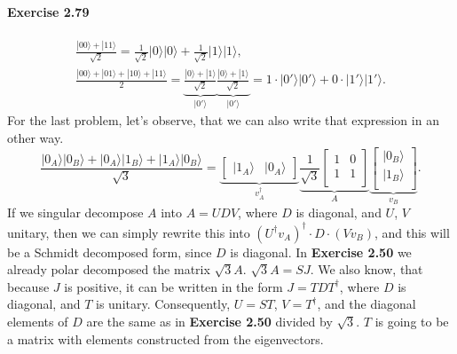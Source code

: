 \documentclass[a4paper,12pt]{article}
\newcommand{\exercise}[1]{\paragraph{Exercise #1}}
\newcommand{\ra}{\rangle}
\begin{document}
    \exercise{2.79}
    \begin{gather}
        \nonumber
        \frac{ | 00 \ra + | 11 \ra }{\sqrt{2}} = \frac{1}{\sqrt{2}}| 0 \ra | 0 \ra + \frac{1}{\sqrt{2}}| 1 \ra | 1 \ra \textrm{,}\\
        \nonumber
        \frac{ | 00 \ra + | 01 \ra + | 10 \ra + | 11 \ra }{2} = \underbrace{\frac{|0\ra + |1\ra}{\sqrt{2}}}_{|0' \ra} \underbrace{\frac{|0\ra + |1\ra}{\sqrt{2}}}_{|0' \ra} = 1 \cdot |0'\ra |0'\ra + 0 \cdot |1'\ra |1'\ra \textrm{.}
    \end{gather}
    For the last problem, let's observe, that we can also write that expression in an other way.
    \begin{equation}
        \frac{|0_A \ra |0_B \ra + |0_A \ra |1_B \ra + |1_A \ra |0_B \ra}{\sqrt{3}} =
        \underbrace{
            \begin{bmatrix}
                | 1_A \ra & |0_A \ra
            \end{bmatrix}
        }_{v_A^\dagger}
        \underbrace{
            \frac{1}{\sqrt{3}}
            \begin{bmatrix}
                1 & 0\\
                1 & 1\\
            \end{bmatrix}
        }_{A}
        \underbrace{
            \begin{bmatrix}
                | 0_B \ra\\
                | 1_B \ra\\
            \end{bmatrix}
        }_{v_B} \textrm{.}
    \end{equation}
    If we singular decompose $A$ into $A = UDV$, where $D$ is diagonal, and $U$, $V$ unitary, then we can simply rewrite this into $(U^\dagger v_A)^\dagger \cdot D \cdot (V v_B)$, and this will be a Schmidt decomposed form, since $D$ is diagonal. In \textbf{Exercise 2.50} we already polar decomposed the matrix $\sqrt{3}A$. $\sqrt{3}A = SJ$. We also know, that because $J$ is positive, it can be written in the form $J = TDT^\dagger$, where $D$ is diagonal, and $T$ is unitary. Consequently, $U = ST$, $V = T^\dagger$, and the diagonal elements of $D$ are the same as in \textbf{Exercise 2.50} divided by $\sqrt{3}$. $T$ is going to be a matrix with elements constructed from the eigenvectors.
\end{document}
